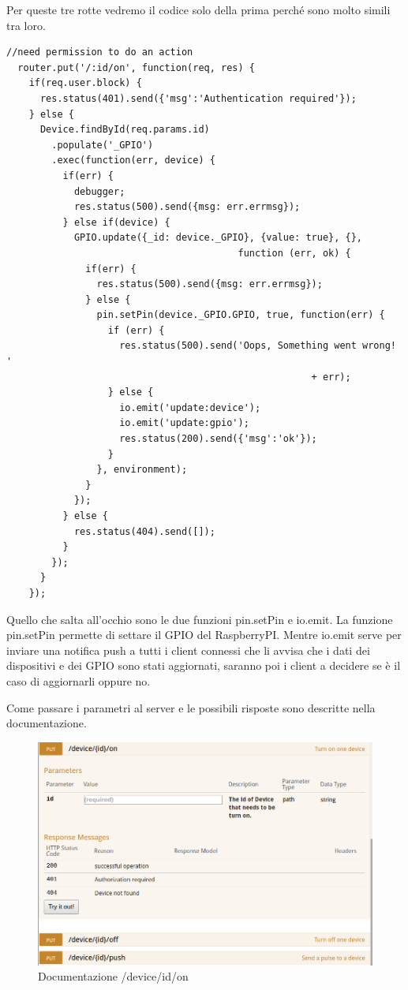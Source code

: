 \newpage
Per queste tre rotte vedremo il codice solo della prima perché sono molto simili tra loro.
\begin{lstlisting}[caption={/webserver/app/routes/device.js on}, style=javaScriptCode]
  //need permission to do an action
  router.put('/:id/on', function(req, res) {
    if(req.user.block) {
      res.status(401).send({'msg':'Authentication required'});
    } else {
      Device.findById(req.params.id)
        .populate('_GPIO')
        .exec(function(err, device) {
          if(err) {
            debugger;
            res.status(500).send({msg: err.errmsg});
          } else if(device) {
            GPIO.update({_id: device._GPIO}, {value: true}, {}, 
                                         function (err, ok) {
              if(err) {
                res.status(500).send({msg: err.errmsg});
              } else {
                pin.setPin(device._GPIO.GPIO, true, function(err) {
                  if (err) {
                    res.status(500).send('Oops, Something went wrong! '
                                                      + err);
                  } else {
                    io.emit('update:device');
                    io.emit('update:gpio');
                    res.status(200).send({'msg':'ok'});
                  }
                }, environment);
              }
            });
          } else {
            res.status(404).send([]);
          }
        });
      }
    });
\end{lstlisting}
Quello che salta all'occhio sono le due funzioni pin.setPin e io.emit.
La funzione pin.setPin permette di settare il GPIO del RaspberryPI.
Mentre io.emit serve per inviare una notifica push a tutti i client connessi che li avvisa che i dati dei dispositivi e dei GPIO sono stati aggiornati, saranno poi i client a decidere se è il caso di aggiornarli oppure no.  

Come passare i parametri al server e le possibili risposte sono descritte nella documentazione.
\begin{figure}[h]
\centering
\includegraphics[width=1\textwidth]{API/device_on.png} 
\caption{Documentazione /device/{id}/on}
\label{fig:device:on}
\end{figure}


